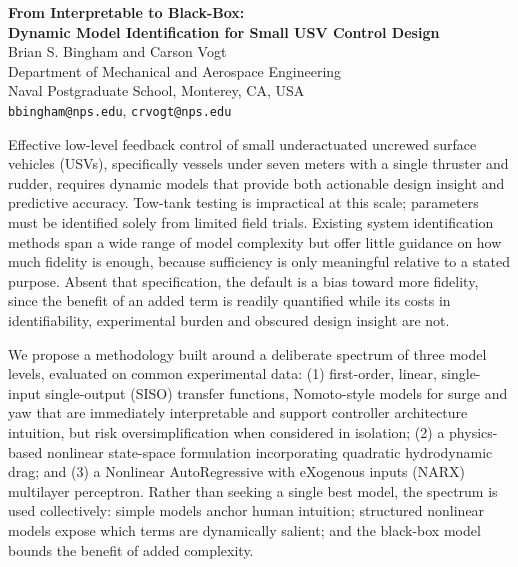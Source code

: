 \documentclass[12pt]{article}
\begin{document}
\begin{center}
  {\large\bfseries From Interpretable to Black-Box:\\Dynamic Model Identification
  for Small USV Control Design}\\[0.8em]
  Brian S. Bingham and Carson Vogt\\
  Department of Mechanical and Aerospace Engineering\\
  Naval Postgraduate School, Monterey, CA, USA\\
  \texttt{bbingham@nps.edu}, \texttt{crvogt@nps.edu}
\end{center}

\bigskip

Effective low-level feedback control of small underactuated uncrewed surface
vehicles (USVs), specifically vessels under seven meters with a single thruster
and rudder, requires dynamic models that provide both actionable design insight and
predictive accuracy. Tow-tank testing is impractical at this scale;
parameters must be identified solely from limited field trials. Existing system
identification methods span a wide range of model complexity but offer little
guidance on how much fidelity is enough, because sufficiency is only meaningful
relative to a stated purpose. Absent that specification, the default is a bias
toward more fidelity, since the benefit of an added term is readily quantified
while its costs in identifiability, experimental burden and obscured design
insight are not.

We propose a methodology built around a deliberate spectrum of three model levels,
evaluated on common experimental data: (1) first-order, linear,
single-input single-output (SISO) transfer functions, Nomoto-style models for
surge and yaw that are immediately interpretable and support controller architecture
intuition, but risk oversimplification when considered in isolation;
(2) a physics-based nonlinear state-space formulation incorporating quadratic
hydrodynamic drag; and (3) a Nonlinear AutoRegressive with eXogenous inputs (NARX)
multilayer perceptron. Rather than seeking a single best model, the spectrum is
used collectively: simple models anchor human intuition; structured nonlinear models
expose which terms are dynamically salient; and the black-box model bounds the
benefit of added complexity.
\end{document}
